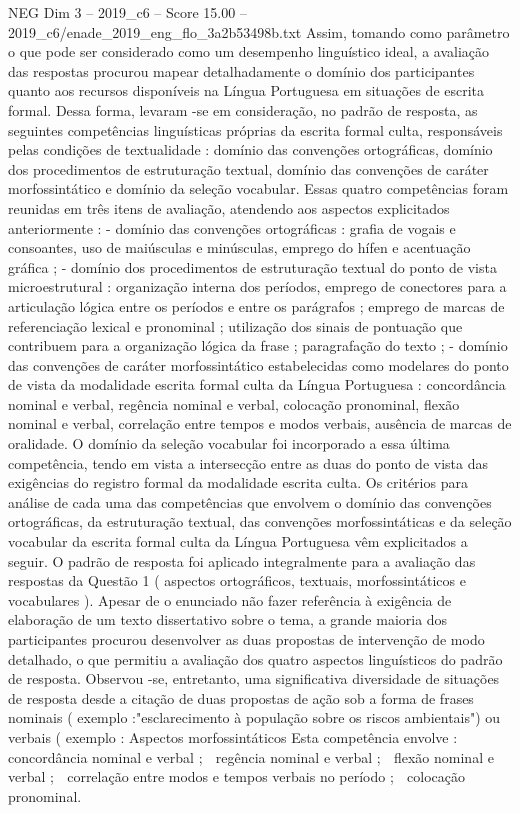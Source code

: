 \begin{textsample}{NEG Dim 3 – 2019\_c6 – Score 15.00 – 2019\_c6/enade\_2019\_eng\_flo\_3a2b53498b.txt}
Assim, tomando como parâmetro o que pode ser considerado como um desempenho linguístico ideal, a avaliação das respostas procurou mapear detalhadamente o domínio dos participantes quanto aos recursos disponíveis na Língua Portuguesa em situações de escrita formal.
Dessa forma, levaram -se em consideração, no padrão de resposta, as seguintes competências linguísticas próprias da escrita formal culta, responsáveis pelas condições de textualidade : domínio das convenções ortográficas, domínio dos procedimentos de estruturação textual, domínio das convenções de caráter morfossintático e domínio da seleção vocabular.
Essas quatro competências foram reunidas em três itens de avaliação, atendendo aos aspectos explicitados anteriormente : - domínio das convenções ortográficas : grafia de vogais e consoantes, uso de maiúsculas e minúsculas, emprego do hífen e acentuação gráfica ; - domínio dos procedimentos de estruturação textual do ponto de vista microestrutural : organização interna dos períodos, emprego de conectores para a articulação lógica entre os períodos e entre os parágrafos ; emprego de marcas de referenciação lexical e pronominal ; utilização dos sinais de pontuação que contribuem para a organização lógica da frase ; paragrafação do texto ; - domínio das convenções de caráter morfossintático estabelecidas como modelares do ponto de vista da modalidade escrita formal culta da Língua Portuguesa : concordância nominal e verbal, regência nominal e verbal, colocação pronominal, flexão nominal e verbal, correlação entre tempos e modos verbais, ausência de marcas de oralidade.
O domínio da seleção vocabular foi incorporado a essa última competência, tendo em vista a intersecção entre as duas do ponto de vista das exigências do registro formal da modalidade escrita culta.
Os critérios para análise de cada uma das competências que envolvem o domínio das convenções ortográficas, da estruturação textual, das convenções morfossintáticas e da seleção vocabular da escrita formal culta da Língua Portuguesa vêm explicitados a seguir.
O padrão de resposta foi aplicado integralmente para a avaliação das respostas da Questão 1 ( aspectos ortográficos, textuais, morfossintáticos e vocabulares ).
Apesar de o enunciado não fazer referência à exigência de elaboração de um texto dissertativo sobre o tema, a grande maioria dos participantes procurou desenvolver as duas propostas de intervenção de modo detalhado, o que permitiu a avaliação dos quatro aspectos linguísticos do padrão de resposta.
Observou -se, entretanto, uma significativa diversidade de situações de resposta desde a citação de duas propostas de ação sob a forma de frases nominais ( exemplo :"esclarecimento à população sobre os riscos ambientais") ou verbais ( exemplo : Aspectos morfossintáticos Esta competência envolve :  concordância nominal e verbal ;  regência nominal e verbal ;  flexão nominal e verbal ;  correlação entre modos e tempos verbais no período ;  colocação pronominal.

\end{textsample}
